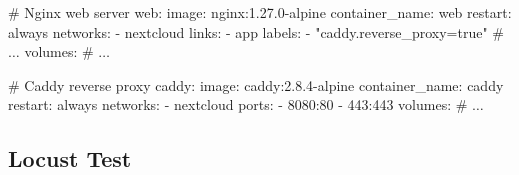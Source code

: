 \documentclass[xcolor=table,fontsize=10pt]{beamer}
\begin{document}
\begin{frame}[fragile]
{\begin{minipage}{0.55\textwidth}
\begin{adjustbox}{max width=\textwidth}
\begin{tikzpicture}
	\end{tikzpicture}
\end{adjustbox}

\end{minipage}
\begin{minipage}{0.4\textwidth}

\begin{yaml}
# Nginx web server
web:
	image: nginx:1.27.0-alpine
	container_name: web
	restart: always
	networks:
		- nextcloud
	links:
		- app
	labels:
		- "caddy.reverse_proxy=true"
		# $\dots$
	volumes:
		# $\dots$


# Caddy reverse proxy
caddy:
	image: caddy:2.8.4-alpine
	container_name: caddy
	restart: always
	networks:
		- nextcloud
	ports:
		- 8080:80
		- 443:443
	volumes:
		# $\dots$
\end{yaml}

\end{minipage}

	}
\end{frame}
\subsection{Locust Test}
\end{document}
